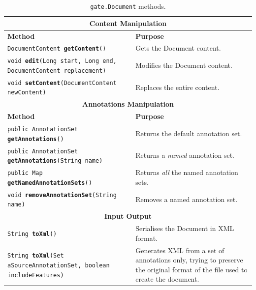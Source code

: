 \begin{table}[htbp]
\begin{small}
\begin{center}
\begin{tabular}{|p{}|p{}|}
\hline
\multicolumn{2}{|c|}{\textbf{Content Manipulation}}\\
\hline
\hline
\textbf{Method} & \textbf{Purpose}\\
\hline
{\tt DocumentContent {\bf getContent}()} & Gets the Document content. \\
\hline
{\tt void {\bf edit}(Long start, Long end, DocumentContent replacement)} &
Modifies the Document content.\\
\hline
{\tt void {\bf setContent}(DocumentContent newContent)} & Replaces the entire
content.\\
\hline
\multicolumn{2}{|c|}{\textbf{Annotations Manipulation}}\\
\hline
\hline
\textbf{Method} & \textbf{Purpose}\\
\hline
{\tt public AnnotationSet {\bf getAnnotations}()} & Returns the default annotation
set.\\
\hline
{\tt public AnnotationSet {\bf getAnnotations}(String name)} & Returns a {\em
named} annotation set.\\
\hline
{\tt public Map {\bf getNamedAnnotationSets}()} & Returns {\em all} the named
annotation sets.\\
\hline
{\tt void {\bf removeAnnotationSet}(String name)} & Removes a named
annotation set.\\
\hline
\multicolumn{2}{|c|}{\textbf{Input Output}}\\
\hline
\hline
{\tt String {\bf toXml}()} & Serialises the Document in XML format.\\
\hline
{\tt String {\bf toXml}(Set aSourceAnnotationSet, boolean includeFeatures)}
& Generates XML from a set of annotations only, trying to preserve the
original format of the file used to create the document.\\ 
\hline
\end{tabular}
\caption{{\tt gate.Document} methods.}
\label{table:document}
\end{center}
\end{small}
\end{table}



